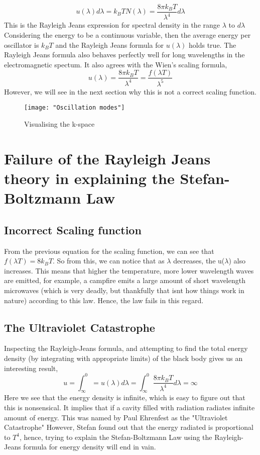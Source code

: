 \begin{equation}
	u(\lambda)d\lambda = k_BTN(\lambda)=\frac{8\pi k_BT}{\lambda^4}d\lambda
\end{equation}
This is the Rayleigh Jeans expression for spectral density in the range $\lambda$ to $d\lambda$
Considering the energy to be a continuous variable, then the average energy per oscillator is $k_BT$ and the Rayleigh Jeans formula for $u(\lambda)$ holds true. The Rayleigh Jeans formula also behaves perfectly well for long wavelengths in the electromagnetic spectum. It also agrees with the Wien's scaling formula,
\begin{equation}
	u(\lambda)=\frac{8\pi k_BT}{\lambda^4}=\frac{f(\lambda T)}{\lambda^5}
\end{equation}
However, we will see in the next section why this is not a correct scaling function.\\
\begin{figure}[h]
	\centering
	\texttt{[image: "Oscillation modes"]}
	\caption[Visualising the k-space]{Visualising the k-space}
	\label{fig:oscillation-modes}
\end{figure}
\newpage
\section{Failure of the Rayleigh Jeans theory in explaining the Stefan-Boltzmann Law}
\subsection{Incorrect Scaling function}
From the previous equation for the scaling function, we can see that $f(\lambda T)=8k_BT$. So from this, we can notice that as $\lambda$ decreases, the u($\lambda$) also increases. This means that higher the temperature, more lower wavelength waves are emitted, for example, a campfire emits a large amount of short wavelength microwaves (which is very deadly, but thankfully that isnt how things work in nature) according to this law. Hence, the law fails in this regard.

\subsection{The Ultraviolet Catastrophe}
Inspecting the Rayleigh-Jeans formula, and attempting to find the total energy density (by integrating with appropriate limits) of the black body gives us an interesting result,
\begin{equation}
	u=\int_{\infty}^{0}=u(\lambda)d\lambda=\int_{\infty}^{0}\frac{8\pi k_B T}{\lambda^4}d\lambda=\infty
\end{equation}
Here we see that the energy density is infinite, which is easy to figure out that this is nonsensical. It implies that if a cavity filled with radiation radiates infinite amount of energy. This was named by Paul Ehrenfest as the "Ultraviolet Catastrophe" However, Stefan found out that the energy radiated is proportional to $T^4$, hence, trying to explain the Stefan-Boltzmann Law using the Rayleigh-Jeans formula for energy density will end in vain.
